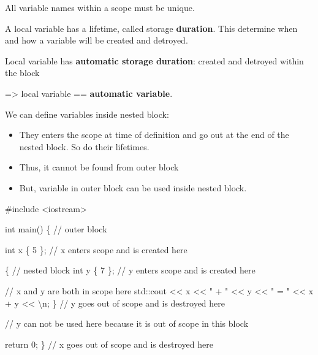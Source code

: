 \documentclass[
  letterpaper,
  DIV=11,
  numbers=noendperiod]{scrreprt}
\newenvironment{Shaded}{\begin{snugshade}}{\end{snugshade}}
\newcommand{\CommentTok}[1]{\textcolor[rgb]{0.37,0.37,0.37}{#1}}
\newcommand{\ControlFlowTok}[1]{\textcolor[rgb]{0.00,0.23,0.31}{#1}}
\newcommand{\DecValTok}[1]{\textcolor[rgb]{0.68,0.00,0.00}{#1}}
\newcommand{\ErrorTok}[1]{\textcolor[rgb]{0.68,0.00,0.00}{#1}}
\newcommand{\FunctionTok}[1]{\textcolor[rgb]{0.28,0.35,0.67}{#1}}
\newcommand{\NormalTok}[1]{\textcolor[rgb]{0.00,0.23,0.31}{#1}}
\newcommand{\SpecialCharTok}[1]{\textcolor[rgb]{0.37,0.37,0.37}{#1}}
\newcommand{\StringTok}[1]{\textcolor[rgb]{0.13,0.47,0.30}{#1}}
\begin{document}
All variable names within a scope must be unique.

A local variable has a lifetime, called storage \textbf{duration}. This
determine when and how a variable will be created and detroyed.

Local variable has \textbf{automatic storage duration}: created and
detroyed within the block

=\textgreater{} local variable == \textbf{automatic variable}.

We can define variables inside nested block:

\begin{itemize}
\item
  They enters the scope at time of definition and go out at the end of
  the nested block. So do their lifetimes.
\item
  Thus, it cannot be found from outer block
\item
  But, variable in outer block can be used inside nested block.
\end{itemize}

\begin{Shaded}
\begin{Highlighting}[]
\CommentTok{\#include \textless{}iostream\textgreater{}}

\NormalTok{int }\FunctionTok{main}\NormalTok{()}
\NormalTok{\{ }\SpecialCharTok{/}\ErrorTok{/}\NormalTok{ outer block}

\NormalTok{    int x \{ }\DecValTok{5}\NormalTok{ \}; }\SpecialCharTok{/}\ErrorTok{/}\NormalTok{ x enters scope and is created here}

\NormalTok{    \{ }\SpecialCharTok{/}\ErrorTok{/}\NormalTok{ nested block}
\NormalTok{        int y \{ }\DecValTok{7}\NormalTok{ \}; }\SpecialCharTok{/}\ErrorTok{/}\NormalTok{ y enters scope and is created here}

        \SpecialCharTok{/}\ErrorTok{/}\NormalTok{ x and y are both }\ControlFlowTok{in}\NormalTok{ scope here}
\NormalTok{        std}\SpecialCharTok{::}\NormalTok{cout }\SpecialCharTok{\textless{}}\ErrorTok{\textless{}}\NormalTok{ x }\SpecialCharTok{\textless{}}\ErrorTok{\textless{}} \StringTok{" + "} \SpecialCharTok{\textless{}}\ErrorTok{\textless{}}\NormalTok{ y }\SpecialCharTok{\textless{}}\ErrorTok{\textless{}} \StringTok{" = "} \SpecialCharTok{\textless{}}\ErrorTok{\textless{}}\NormalTok{ x }\SpecialCharTok{+}\NormalTok{ y }\SpecialCharTok{\textless{}}\ErrorTok{\textless{}} \StringTok{\textquotesingle{}}\SpecialCharTok{\textbackslash{}n}\StringTok{\textquotesingle{}}\NormalTok{;}
\NormalTok{    \} }\SpecialCharTok{/}\ErrorTok{/}\NormalTok{ y goes out of scope and is destroyed here}

    \SpecialCharTok{/}\ErrorTok{/}\NormalTok{ y can not be used here because it is out of scope }\ControlFlowTok{in}\NormalTok{ this block}

\NormalTok{    return }\DecValTok{0}\NormalTok{;}
\NormalTok{\} }\SpecialCharTok{/}\ErrorTok{/}\NormalTok{ x goes out of scope and is destroyed here}
\end{Highlighting}
\end{Shaded}
\end{document}
